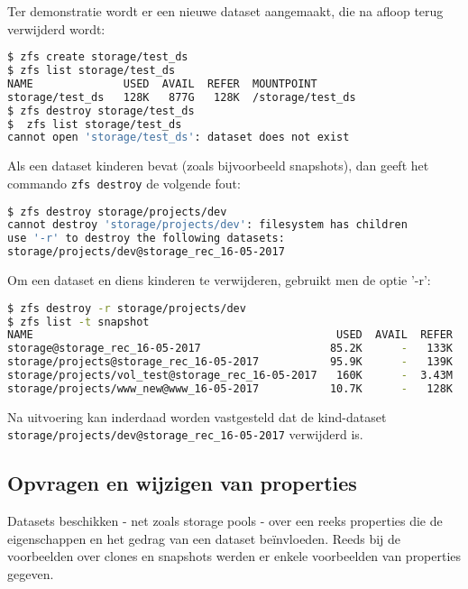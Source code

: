 Ter demonstratie wordt er een nieuwe dataset aangemaakt, die na afloop terug verwijderd wordt:

\begin{lstlisting}[language=bash,style=command_style] 
$ zfs create storage/test_ds
$ zfs list storage/test_ds
NAME              USED  AVAIL  REFER  MOUNTPOINT
storage/test_ds   128K   877G   128K  /storage/test_ds
$ zfs destroy storage/test_ds
$  zfs list storage/test_ds
cannot open 'storage/test_ds': dataset does not exist
\end{lstlisting}

Als een dataset kinderen bevat (zoals bijvoorbeeld snapshots), dan geeft het commando \texttt{zfs destroy} de volgende fout:

\begin{lstlisting}[language=bash,style=command_style] 
$ zfs destroy storage/projects/dev
cannot destroy 'storage/projects/dev': filesystem has children
use '-r' to destroy the following datasets:
storage/projects/dev@storage_rec_16-05-2017
\end{lstlisting}

\clearpage

Om een dataset en diens kinderen te verwijderen, gebruikt men de optie '-r':

\begin{lstlisting}[language=bash,style=command_style] 
$ zfs destroy -r storage/projects/dev
$ zfs list -t snapshot
NAME                                               USED  AVAIL  REFER  MOUNTPOINT
storage@storage_rec_16-05-2017                    85.2K      -   133K  -
storage/projects@storage_rec_16-05-2017           95.9K      -   139K  -
storage/projects/vol_test@storage_rec_16-05-2017   160K      -  3.43M  -
storage/projects/www_new@www_16-05-2017           10.7K      -   128K  -
\end{lstlisting}

Na uitvoering kan inderdaad worden vastgesteld dat de kind-dataset \texttt{storage/projects/dev@storage\_rec\_16-05-2017} verwijderd is.

\subsection{Opvragen en wijzigen van properties}

Datasets beschikken - net zoals storage pools - over een reeks properties die de eigenschappen en het gedrag van een dataset beïnvloeden. Reeds bij de voorbeelden over clones en snapshots werden er enkele voorbeelden van properties gegeven. 

